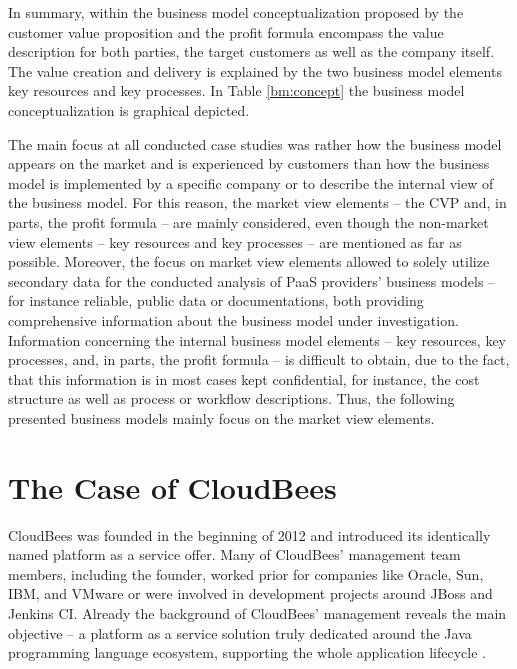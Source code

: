 In summary, within the business model conceptualization proposed by \citet[p. 54]{Johnson2008} the customer value proposition and the profit formula encompass the value description for both parties, the target customers as well as the company itself. The value creation and delivery is explained by the two business model elements key resources and key processes. In Table \ref{bm:concept} the business model conceptualization is graphical depicted.



The main focus at all conducted case studies was rather how the business model appears on the market and is experienced by customers than how the business model is implemented by a specific company or to describe the internal view of the business model. For this reason, the market view elements -- the \ac{CVP} and, in parts, the profit formula -- are mainly considered, even though the non-market view elements -- key resources and key processes -- are mentioned as far as possible. Moreover, the focus on market view elements allowed to solely utilize secondary data for the conducted analysis of \ac{PaaS} providers' business models -- for instance reliable, public data or documentations, both providing comprehensive information about the business model under investigation. Information concerning the internal business model elements -- key resources, key processes, and, in parts, the profit formula -- is difficult to obtain, due to the fact, that this information is in most cases kept confidential, for instance, the cost structure as well as process or workflow descriptions. Thus, the following presented business models mainly focus on the market view elements.

\section{The Case of CloudBees}\label{ch:sota:cb}

CloudBees was founded in the beginning of 2012 and introduced its identically named platform as a service offer. Many of CloudBees' management team members, including the founder, worked prior for companies like Oracle, Sun, IBM, and VMware or were involved in development projects around JBoss and Jenkins CI. Already the background of CloudBees' management reveals the main objective -- a platform as a service solution truly dedicated around the Java programming language ecosystem, supporting the whole application lifecycle \citep{CloudBees2013}.

